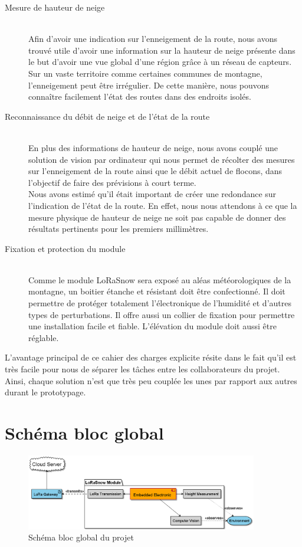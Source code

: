 \begin{description}
    \item[Mesure de hauteur de neige] \hfill \\ 
    Afin d'avoir une indication sur l'enneigement de la route, nous 
    avons trouvé utile d'avoir une information sur la hauteur de neige présente dans le but d'avoir 
    une vue global d'une région grâce à un réseau de capteurs. Sur un vaste territoire comme certaines
    communes de montagne, l'enneigement peut être irrégulier. De cette manière, nous pouvons connaître 
    facilement l'état des routes dans des endroits isolés.
    \item[Reconnaissance du débit de neige et de l'état de la route] \hfill \\
    En plus des informations de hauteur de neige, nous avons couplé une solution de vision par ordinateur
    qui nous permet de récolter des mesures sur l'enneigement de la route ainsi que le débit actuel de
    flocons, dans l'objectif de faire des prévisions à court terme.\\
    Nous avons estimé qu'il était important de créer une redondance sur l'indication de l'état de la
    route. En effet, nous nous attendons à ce que la mesure physique de hauteur de neige ne soit pas 
    capable de donner des résultats pertinents pour les premiers millimètres.
    \item[Fixation et protection du module] \hfill \\ 
    Comme le module LoRaSnow sera exposé au aléas météorologiques de la montagne, un boitier étanche 
    et résistant doit être confectionné. Il doit permettre de protéger totalement l'électronique de 
    l'humidité et d'autres types de perturbations. Il offre aussi un collier de fixation pour permettre 
    une installation facile et fiable. L'élévation du module doit aussi être réglable.
\end{description}

L'avantage principal de ce cahier des charges explicite résite dans le fait qu'il est très facile pour
nous de séparer les tâches entre les collaborateurs du projet. Ainsi, chaque solution n'est que très 
peu couplée les unes par rapport aux autres durant le prototypage.

\section{Schéma bloc global}

\begin{figure}[H]
    \centering
    \includegraphics[width=0.9\textwidth]{Diagram/out/Diagram/BlockDiagram/GlobalBlockDiagram.png}
    \caption{Schéma bloc global du projet}
    \label{GlobalBlockDiagram}
\end{figure}

